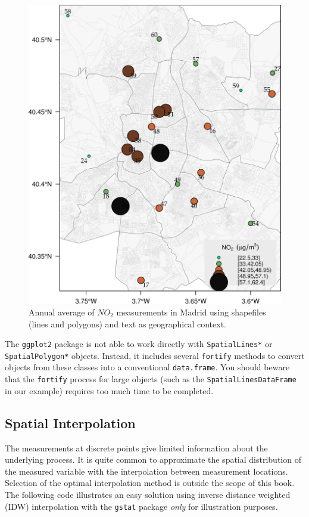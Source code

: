 \begin{figure}[htbp]
\centering
\includegraphics[width=.9\linewidth]{figs/airMadrid.png}
\caption{\label{fig:org304d847}
Annual average of \(NO_2\) measurements in Madrid using shapefiles (lines and polygons) and text as geographical context.}
\end{figure}

The \texttt{ggplot2} package is not able to work directly with
\texttt{SpatialLines*} or \texttt{SpatialPolygon*} objects. Instead, it includes
several \texttt{fortify} methods to convert objects from these classes into a
conventional \texttt{data.frame}. You should beware that the \texttt{fortify}
process for large objects (such as the \texttt{SpatialLinesDataFrame} in our
example) requires too much time to be completed.


\subsection{Spatial Interpolation}
\label{sec:org863e26d}
The measurements at discrete points give limited information about the
underlying process. It is quite common to approximate the spatial
distribution of the measured variable with the interpolation between
measurement locations. Selection of the optimal interpolation method
is outside the scope of this book. The following code illustrates an
easy solution using inverse distance weighted (IDW) interpolation with
the \texttt{gstat} package \cite{Pebesma2004} \emph{only} for illustration
purposes.

